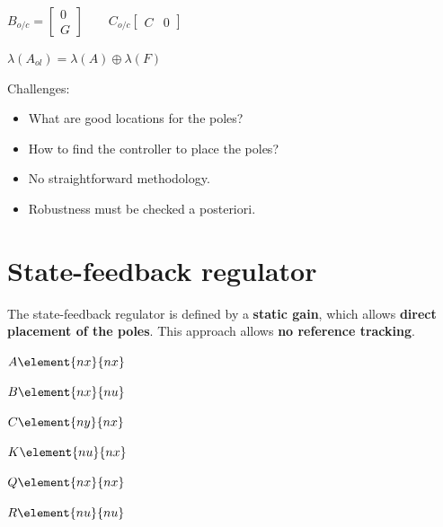 \documentclass[10pt,a4paper]{scrartcl}
\begin{document}
\begin{multicols*}{3}
	$B_{o/c}=\begin{bmatrix}0\\G\end{bmatrix}\qquad C_{o/c}\begin{bmatrix}C&0\end{bmatrix}$
	
	\finn
	
	
	$\lambda(A_{ol})=\lambda(A)\oplus\lambda(F)$
	
	
	
	Challenges:
	\begin{itemize}
	\compaq
	\item What are good locations for the poles?
	\item How to find the controller to place the poles?
	\item No straightforward methodology.
	\item Robustness must be checked a posteriori.
	\end{itemize}
	
	\section{State-feedback regulator}
	
	The state-feedback regulator is defined by a \textbf{static gain}, which allows \textbf{direct placement of the poles}. This approach allows \textbf{no reference tracking}.
	

	\begin{multicols*}{3}	
	
	

	$A\element{nx}{nx}$
	
	$B\element{nx}{nu}$
	
	$C\element{ny}{nx}$
	
	$K\element{nu}{nx}$
	
	$Q\element{nx}{nx}$
	
	$R\element{nu}{nu}$
	
	\end{multicols*}
	

\end{multicols*}
\end{document}
